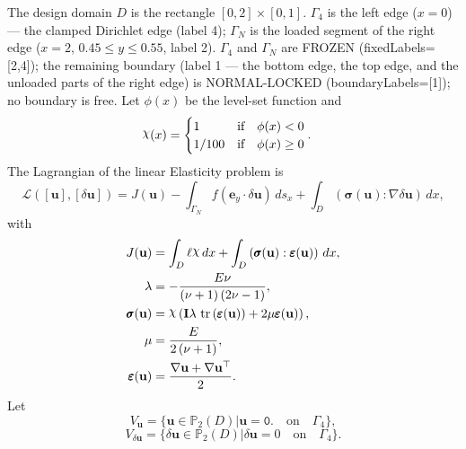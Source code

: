 \documentclass[preview]{standalone}
\let\oldcdot\cdot
\let\cdot\oldcdot
\begin{document}
The design domain $D$ is the rectangle $[0,2]\times[0,1]$.  $\Gamma_{4}$ is the left edge ($x=0$) — the clamped Dirichlet edge (label 4); $\Gamma_N$ is the loaded segment of the right edge ($x=2$, $0.45\le y\le 0.55$, label 2).  $\Gamma_{4}$ and $\Gamma_N$ are FROZEN (fixedLabels=[2,4]); the remaining boundary (label 1 — the bottom edge, the top edge, and the unloaded parts of the right edge) is NORMAL-LOCKED (boundaryLabels=[1]); no boundary is free.
Let $\phi(x)$ be the level-set function and
 \begin{align*}\raisebox{\depth}{$\chi$}(x) &= \begin{cases} 1 & \mbox{if}\quad \phi(x) < 0 \\ 1/100 & \mbox{if}\quad \phi(x)  \ge 0 \end{cases}.\end{align*}
The Lagrangian of the linear Elasticity problem is
\begin{dmath*}
\mathcal L(\left[ {\mathbf{ u }}\right],\left[ {\delta\mathbf{  u }}\right]) = J({\mathbf{ u }}) -  \int_{\Gamma_N} f \left( \mathbf e_y \cdot {\delta\mathbf{  u }} \right) \,ds_x +  \int_{D} \left( \pmb \sigma({\mathbf{ u }}) \mathrel{:}  \nabla {\delta\mathbf{  u }}  \right) \,dx , 
\end{dmath*}
with 
\begin{align*}
J({\mathbf{ u }}) &=  \int_{D} \ell \raisebox{\depth}{$\chi$} \,dx +  \int_{D} \left( \pmb \sigma({\mathbf{ u }}) \mathrel{:} \pmb \varepsilon({\mathbf{ u }}) \right) \,dx,\\
\lambda &= - \frac{E \nu}{\left(\nu + 1\right) \left(2 \nu - 1\right)},\\
\pmb \sigma({\mathbf{ u }}) &= \raisebox{\depth}{$\chi$} \left(\mathbf{I} \lambda  \,\operatorname{tr}\left(\pmb \varepsilon({\mathbf{ u }})\right)  + 2 \mu \pmb \varepsilon({\mathbf{ u }})\right),\\
\mu &= \frac{E}{2 \left(\nu + 1\right)},\\
\pmb \varepsilon({\mathbf{ u }}) &= \frac{ \nabla {\mathbf{ u }}  +   \nabla {\mathbf{ u }} ^\top }{2}.
 \end{align*}
Let
\begin{equation*}
V_{{\mathbf{ u }}} = \{ {\mathbf{ u }} \in \mathbb P_{2}(D)| {\mathbf{ u }} = \mathtt{\text{0.}}  \quad \text{{on}} \quad\Gamma_{4} \},\end{equation*}
\begin{equation*}
V_{{\delta\mathbf{  u }}} = \{ {\delta\mathbf{  u }} \in \mathbb P_{2}(D)| {\delta\mathbf{  u }} = 0  \quad \text{{on}} \quad\Gamma_{4} \}.\end{equation*}
\end{document}
